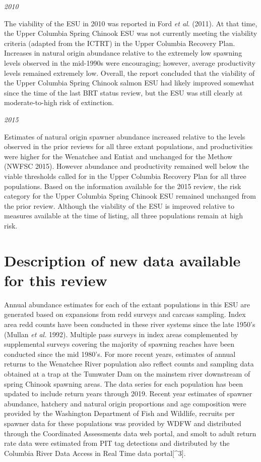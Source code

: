 \documentclass[
  letterpaper,
  oneside,
  open=any]{scrbook}
\begin{document}
\emph{2010 }

The viability of the ESU in 2010 was reported in Ford \emph{et al}.
(2011). At that time, the Upper Columbia Spring Chinook ESU was not
currently meeting the viability criteria (adapted from the ICTRT) in the
Upper Columbia Recovery Plan. Increases in natural origin abundance
relative to the extremely low spawning levels observed in the mid-1990s
were encouraging; however, average productivity levels remained
extremely low. Overall, the report concluded that the viability of the
Upper Columbia Spring Chinook salmon ESU had likely improved somewhat
since the time of the last BRT status review, but the ESU was still
clearly at moderate-to-high risk of extinction.

\emph{2015}

Estimates of natural origin spawner abundance increased relative to the
levels observed in the prior reviews for all three extant populations,
and productivities were higher for the Wenatchee and Entiat and
unchanged for the Methow (NWFSC 2015). However abundance and
productivity remained well below the viable thresholds called for in the
Upper Columbia Recovery Plan for all three populations. Based on the
information available for the 2015 review, the risk category for the
Upper Columbia Spring Chinook ESU remained unchanged from the prior
review. Although the viability of the ESU is improved relative to
measures available at the time of listing, all three populations remain
at high risk.

\hypertarget{description-of-new-data-available-for-this-review-1}{%
\section{Description of new data available for this
review}\label{description-of-new-data-available-for-this-review-1}}

Annual abundance estimates for each of the extant populations in this
ESU are generated based on expansions from redd surveys and carcass
sampling. Index area redd counts have been conducted in these river
systems since the late 1950's (Mullan \emph{et al.} 1992). Multiple pass
surveys in index areas complemented by supplemental surveys covering the
majority of spawning reaches have been conducted since the mid 1980's.
For more recent years, estimates of annual returns to the Wenatchee
River population also reflect counts and sampling data obtained at a
trap at the Tumwater Dam on the mainstem river downstream of spring
Chinook spawning areas. The data series for each population has been
updated to include return years through 2019. Recent year estimates of
spawner abundance, hatchery and natural origin proportions and age
composition were provided by the Washington Department of Fish and
Wildlife, recruits per spawner data for these populations was provided
by WDFW and distributed through the Coordinated Assessments data web
portal, and smolt to adult return rate data were estimated from PIT tag
detections and distributed by the Columbia River Data Access in Real
Time data portal{[}\^{}3{]}.
\end{document}
